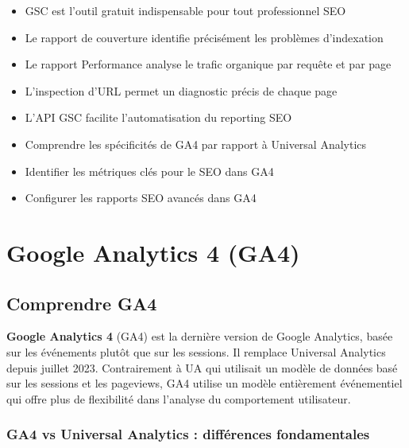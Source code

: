 \documentclass[12pt,a4paper,twoside]{report}
\newcommand{\keyword}[1]{\textbf{\textcolor{googleblue}{#1}}}
\newcommand{\level}[1]{\medskip\bigskip}
\begin{document}
\begin{takeaways}
\begin{itemize}
    \item GSC est l'outil gratuit indispensable pour tout professionnel SEO
    \item Le rapport de couverture identifie précisément les problèmes d'indexation
    \item Le rapport Performance analyse le trafic organique par requête et par page
    \item L'inspection d'URL permet un diagnostic précis de chaque page
    \item L'API GSC facilite l'automatisation du reporting SEO
\end{itemize}
\end{takeaways}

\level{2}
\begin{objectives}
\begin{itemize}
    \item Comprendre les spécificités de GA4 par rapport à Universal Analytics
    \item Identifier les métriques clés pour le SEO dans GA4
    \item Configurer les rapports SEO avancés dans GA4
\end{itemize}
\end{objectives}

\chapter{Google Analytics 4 (GA4)}
\label{ch:ga4}

\section{Comprendre GA4}

\keyword{Google Analytics 4} (GA4) est la dernière version de Google Analytics, basée sur les événements plutôt que sur les sessions. Il remplace Universal Analytics depuis juillet 2023. Contrairement à UA qui utilisait un modèle de données basé sur les sessions et les pageviews, GA4 utilise un modèle entièrement événementiel qui offre plus de flexibilité dans l'analyse du comportement utilisateur.

\subsection{GA4 vs Universal Analytics : différences fondamentales}
\end{document}
